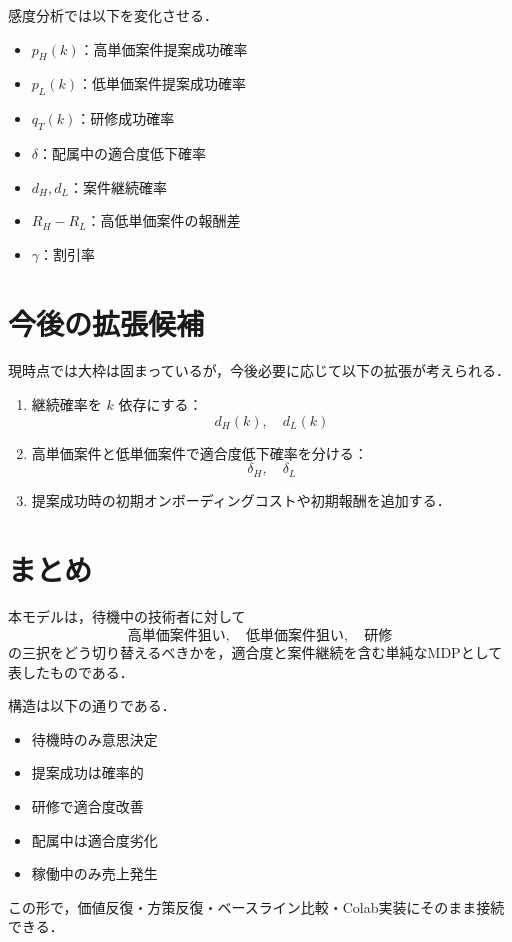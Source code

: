 \documentclass[11pt,a4paper]{bxjsarticle}
\begin{document}
感度分析では以下を変化させる．
\begin{itemize}[leftmargin=2em]
    \item \(p_H(k)\)：高単価案件提案成功確率
    \item \(p_L(k)\)：低単価案件提案成功確率
    \item \(q_T(k)\)：研修成功確率
    \item \(\delta\)：配属中の適合度低下確率
    \item \(d_H,d_L\)：案件継続確率
    \item \(R_H-R_L\)：高低単価案件の報酬差
    \item \(\gamma\)：割引率
\end{itemize}

\section{今後の拡張候補}

現時点では大枠は固まっているが，今後必要に応じて以下の拡張が考えられる．

\begin{enumerate}[leftmargin=2em,label=(\arabic*)]
    \item 継続確率を \(k\) 依存にする：
    \[
        d_H(k),\quad d_L(k)
    \]
    \item 高単価案件と低単価案件で適合度低下確率を分ける：
    \[
        \delta_H,\quad \delta_L
    \]
    \item 提案成功時の初期オンボーディングコストや初期報酬を追加する．
\end{enumerate}

\section{まとめ}

本モデルは，待機中の技術者に対して
\[
    \text{高単価案件狙い},\quad \text{低単価案件狙い},\quad \text{研修}
\]
の三択をどう切り替えるべきかを，適合度と案件継続を含む単純なMDPとして表したものである．

構造は以下の通りである．
\begin{itemize}[leftmargin=2em]
    \item 待機時のみ意思決定
    \item 提案成功は確率的
    \item 研修で適合度改善
    \item 配属中は適合度劣化
    \item 稼働中のみ売上発生
\end{itemize}

この形で，価値反復・方策反復・ベースライン比較・Colab実装にそのまま接続できる．
\end{document}
